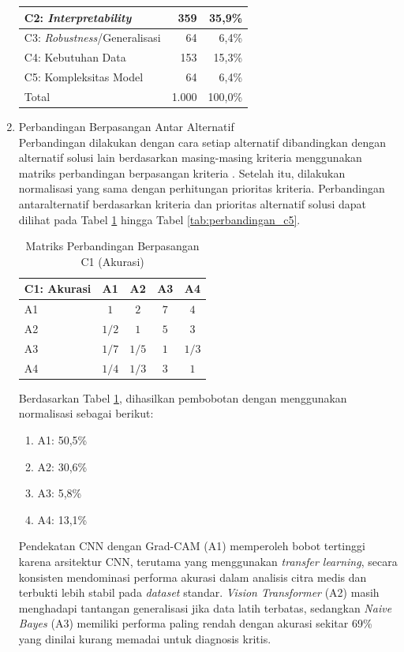 \begin{enumerate}
\begin{table}[h]
\begin{tabular}{|l|r|r|}
			C2: \textit{Interpretability} & 359 & 35,9\% \\ \hline
			C3: \textit{Robustness}/Generalisasi & 64 & 6,4\% \\ \hline
			C4: Kebutuhan Data & 153 & 15,3\% \\ \hline
			C5: Kompleksitas Model & 64 & 6,4\% \\ \hline
			Total & 1.000 & 100,0\% \\ \hline
		\end{tabular}
	\end{table}
	\item Perbandingan Berpasangan Antar Alternatif \\
	Perbandingan dilakukan dengan cara setiap alternatif dibandingkan dengan alternatif solusi lain berdasarkan masing-masing kriteria menggunakan matriks perbandingan berpasangan kriteria \textcite{1000minds2025ahp}. Setelah itu, dilakukan normalisasi yang sama dengan perhitungan prioritas kriteria. Perbandingan antaralternatif berdasarkan kriteria dan prioritas alternatif solusi dapat dilihat pada Tabel \ref{tab:perbandingan_c1} hingga Tabel \ref{tab:perbandingan_c5}.
	\begin{table}[H]
		\centering
		\caption{Matriks Perbandingan Berpasangan C1 (Akurasi)}
		\label{tab:perbandingan_c1}
		\begin{tabular}{|l|c|c|c|c|}
			\hline
			C1: Akurasi & A1 & A2 & A3 & A4 \\ \hline
			A1 & $1$ & $2$ & $7$ & $4$ \\ \hline
			A2 & $1/2$ & $1$ & $5$ & $3$ \\ \hline
			A3 & $1/7$ & $1/5$ & $1$ & $1/3$ \\ \hline
			A4 & $1/4$ & $1/3$ & $3$ & $1$ \\ \hline
		\end{tabular}
	\end{table}
	
	Berdasarkan Tabel \ref{tab:perbandingan_c1}, dihasilkan pembobotan dengan menggunakan normalisasi sebagai berikut:
	\begin{enumerate}
		\item A1: 50,5\%
		\item A2: 30,6\%
		\item A3: 5,8\%
		\item A4: 13,1\%\\
	\end{enumerate}
	
	Pendekatan CNN dengan Grad-CAM (A1) memperoleh bobot tertinggi karena arsitektur CNN, terutama yang menggunakan \textit{transfer learning}, secara konsisten mendominasi performa akurasi dalam analisis citra medis dan terbukti lebih stabil pada \textit{dataset} standar. \textit{Vision Transformer} (A2) masih menghadapi tantangan generalisasi jika data latih terbatas, sedangkan \textit{Naive Bayes} (A3) memiliki performa paling rendah dengan akurasi sekitar 69\% yang dinilai kurang memadai untuk diagnosis kritis.
	

\end{enumerate}
